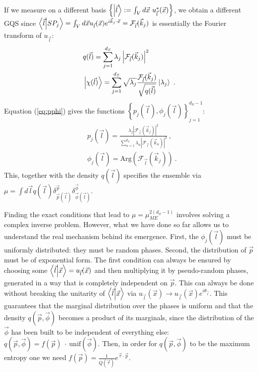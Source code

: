 \documentclass[draft,nofootinbib,pre,twocolumn,showpacs,showkeys,groupaddress,preprintnumbers,floatfix]{revtex4-1}
\newcommand{\1}{\mathbbm{1}}
\begin{document}
If we measure on a different basis $\left\{ \ket{\vec{l}} :=\int_V
d\vec{x}~u^{*}_{\vec{l}}(\vec{x})\right\}$, we obtain a different GQS since $\braket{\vec{l}}{SP_j} = \int_V d\vec{x}u_{\vec{l}}(\vec{x})e^{i\vec{k}_j \cdot \vec{x}} = \mathcal{F}_{\vec{l}}(\vec{k}_j)$ is essentially the Fourier transform of $u_{\vec{l}}$:
\begin{align}
&q(\vec{l}) = \sum_{j=1}^{d_S} \lambda_j \left\vert\mathcal{F}_{\vec{l}}(\vec{k}_j)\right\vert^2\\
& \ket{\chi(\vec{l})} = \sum_{j=1}^{d_S} \sqrt{\lambda_j} \frac{\mathcal{F}_{\vec{l}}(\vec{k}_j)}{\sqrt{q(\vec{l})}}\ket{\lambda_j}\label{eq:pphi}
  ~.
\end{align}
Equation (\ref{eq:pphi}) gives the functions $\left\{
p_j(\vec{l}),\phi_j(\vec{l})\right\}_{j=1}^{d_S-1}$:
\begin{align}
&p_j(\vec{l}) = \frac{\lambda_j \left\vert\mathcal{F}_{\vec{l}}(\vec{k}_j)\right\vert^2 }{\sum_{n=1}^{d_S} \lambda_n \left\vert\mathcal{F}_{\vec{l}}(\vec{k}_n)\right\vert^2}
  ~, \label{eq:pjl}\\
&\phi_j(\vec{l}) = \mathrm{Arg}\left( \mathcal{F}_{\vec{l}}(\vec{k}_j)\right)
  ~.\label{eq:phijl}
\end{align}
This, together with the density $q(\vec{l})$ specifies the ensemble via $\mu = \int d\vec{l} q(\vec{l}) \delta^{\vec{p}}_{\vec{p}(\vec{l})} \delta^{\vec{\phi}}_{\vec{\phi}(\vec{l})}$.

Finding the exact conditions that lead to $\mu = \mu_{ME}^{2(d_S-1)}$ involves
solving a complex inverse problem. However, what we have done so far allows us
to understand the real mechanism behind its emergence. First, the
$\phi_j(\vec{l})$ must be uniformly distributed: they must be random phases.
Second, the distribution of $\vec{p}$ must be of exponential form. The first
condition can always be ensured by choosing some $\braket{\vec{l}}{\vec{x}} =
u_{\vec{l}}(\vec{x})$ and then multiplying it by pseudo-random phases,
generated in a way that is completely independent on $\vec{p}$. This can always
be done without breaking the unitarity of $\braket{\vec{l}}{\vec{x}}$ via
$u_{\vec{l}}(\vec{x}) \to u_{\vec{l}}(\vec{x})e^{i\theta_{\vec{l}}}$. This
guarantees that the marginal distribution over the phases is uniform and that
the density $q(\vec{p},\vec{\phi})$ becomes a product of its marginals, since
the distribution of the $\vec{\phi}$ has been built to be independent of
everything else: $q(\vec{p},\vec{\phi}) =
f(\vec{p})~\cdot~\mathrm{unif}(\vec{\phi})$. Then, in order for
$q(\vec{p},\vec{\phi})$ to be the maximum entropy one we need $f(\vec{p}) =
\frac{1}{Q(\vec{\tau})}e^{\vec{\tau}\cdot \vec{p}}$.
\end{document}
